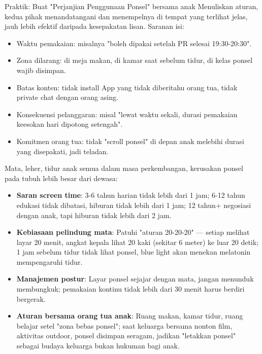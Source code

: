\begin{tcbpractice}{Praktik: Buat "Perjanjian Penggunaan Ponsel" bersama anak}
Menuliskan aturan, kedua pihak menandatangani dan menempelnya di tempat yang terlihat jelas, jauh lebih efektif daripada kesepakatan lisan. Saranan isi:

\begin{itemize}
  \item Waktu pemakaian: misalnya "boleh dipakai setelah PR selesai 19:30-20:30".
  \item Zona dilarang: di meja makan, di kamar saat sebelum tidur, di kelas ponsel wajib disimpan.
  \item Batas konten: tidak install App yang tidak diberitahu orang tua, tidak private chat dengan orang asing.
  \item Konsekuensi pelanggaran: misal "lewat waktu sekali, durasi pemakaian keesokan hari dipotong setengah".
  \item Komitmen orang tua: tidak "scroll ponsel" di depan anak melebihi durasi yang disepakati, jadi teladan.
\end{itemize}

\end{tcbpractice}


Mata, leher, tidur anak semua dalam masa perkembangan, kerusakan ponsel pada tubuh lebih besar dari dewasa:

\begin{itemize}
  \item \textbf{Saran screen time}: 3-6 tahun harian tidak lebih dari 1 jam; 6-12 tahun edukasi tidak dibatasi, hiburan tidak lebih dari 1 jam; 12 tahun+ negosiasi dengan anak, tapi hiburan tidak lebih dari 2 jam.
  \item \textbf{Kebiasaan pelindung mata}: Patuhi "aturan 20-20-20" — setiap melihat layar 20 menit, angkat kepala lihat 20 kaki (sekitar 6 meter) ke luar 20 detik; 1 jam sebelum tidur tidak lihat ponsel, blue light akan menekan melatonin mempengaruhi tidur.
  \item \textbf{Manajemen postur}: Layar ponsel sejajar dengan mata, jangan menunduk membungkuk; pemakaian kontinu tidak lebih dari 30 menit harus berdiri bergerak.
  \item \textbf{Aturan bersama orang tua anak}: Ruang makan, kamar tidur, ruang belajar setel "zona bebas ponsel"; saat keluarga bersama nonton film, aktivitas outdoor, ponsel disimpan seragam, jadikan "letakkan ponsel" sebagai budaya keluarga bukan hukuman bagi anak.
\end{itemize}


